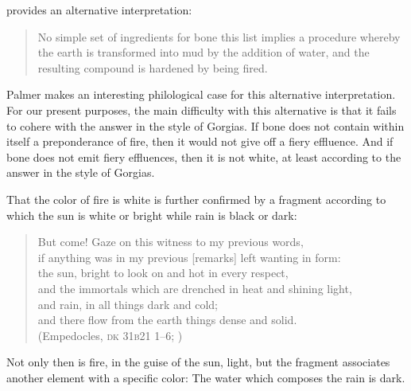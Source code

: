 \citet[301--302]{Palmer:2009qf} provides an alternative interpretation:
\begin{quote}
	No simple set of ingredients for bone this list implies a procedure whereby the earth is transformed into mud by the addition of water, and the resulting compound is hardened by being fired. \citep[302]{Palmer:2009qf}
\end{quote}
Palmer makes an interesting philological case for this alternative interpretation. For our present purposes, the main difficulty with this alternative is that it fails to cohere with the answer in the style of Gorgias. If bone does not contain within itself a preponderance of fire, then it would not give off a fiery effluence. And if bone does not emit fiery effluences, then it is not white, at least according to the answer in the style of Gorgias.

That the color of fire is white is further confirmed by a fragment according to which the sun is white or bright while rain is black or dark:
\begin{verse}
    But come! Gaze on this witness to my previous words,\\
    if anything was in my previous [remarks] left wanting in form:\\
    the sun\index, bright to look on and hot in every respect,\\
    and the immortals which are drenched in heat and shining light,\\
    and rain, in all things dark and cold;\\
    and there flow from the earth things dense and solid.\\
    (Empedocles, \textsc{dk} 31\textsc{b}21 1--6; \citealt[26 1--6, 229]{Inwood:2001ve})
\end{verse}
Not only then is fire, in the guise of the sun, light, but the fragment associates another element with a specific color: The water which composes the rain is dark.

